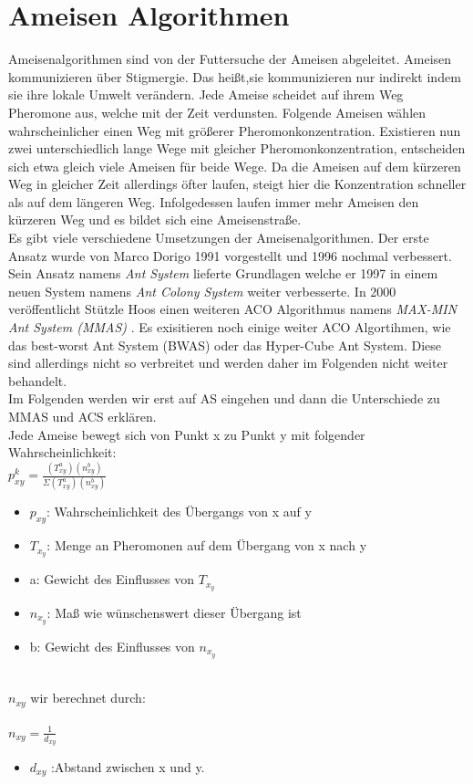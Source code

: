 \section{Ameisen Algorithmen}
Ameisenalgorithmen sind von der Futtersuche der Ameisen abgeleitet. Ameisen kommunizieren über Stigmergie. Das heißt,sie kommunizieren nur indirekt indem sie ihre lokale Umwelt verändern. Jede Ameise scheidet auf ihrem Weg Pheromone aus, welche mit der Zeit verdunsten. 
Folgende Ameisen wählen wahrscheinlicher einen Weg mit größerer Pheromonkonzentration. 
Existieren nun zwei unterschiedlich lange Wege mit gleicher Pheromonkonzentration, entscheiden sich etwa gleich viele Ameisen für beide Wege. 
Da die Ameisen auf dem kürzeren Weg in gleicher Zeit allerdings öfter laufen, steigt hier die Konzentration schneller als auf dem längeren Weg. 
Infolgedessen laufen immer mehr Ameisen den kürzeren Weg und es bildet sich eine Ameisenstraße.\\

Es gibt viele verschiedene Umsetzungen der Ameisenalgorithmen. Der erste Ansatz wurde von Marco Dorigo 1991 vorgestellt\cite{Dorigo1991AntSA} und 1996 nochmal verbessert\cite{484436}.
Sein Ansatz namens \emph{Ant System} lieferte Grundlagen welche er 1997 in einem neuen System namens \emph{Ant Colony System} weiter verbesserte\cite{585892}. In 2000 veröffentlicht Stützle Hoos einen weiteren ACO Algorithmus namens \emph{MAX-MIN Ant System (MMAS)} \cite{STUTZLE2000889}. Es exisitieren noch einige weiter ACO Algortihmen, wie das best-worst Ant System (BWAS)\cite{cordon2000new} oder das Hyper-Cube Ant System. Diese sind allerdings nicht so verbreitet und werden daher im Folgenden nicht weiter behandelt.\cite{blum2004hyper}   \\
Im Folgenden werden wir erst auf AS eingehen und dann die Unterschiede zu MMAS und ACS erklären.\\
Jede Ameise bewegt sich von Punkt x zu Punkt y mit folgender Wahrscheinlichkeit:\\

\large$p_{xy}^k=\frac{(T_{xy}^a)(n_{xy}^b)}{\Sigma(T_{xy}^a)(n_{xy}^b) }$
\normalsize
\begin{itemize}
  \item $p_{xy}$: Wahrscheinlichkeit des Übergangs von x auf y
  \item $T_x_y$: Menge an Pheromonen auf dem Übergang von x nach y 
  \item a: Gewicht des Einflusses von $T_x_y$
  \item $n_x_y$: Maß wie wünschenswert dieser Übergang ist
  \item b: Gewicht des Einflusses von $n_x_y$
\end{itemize}
\\
$n_{xy}$ wir berechnet durch:\\\\\large
$n_{xy}=\frac{1}{d_{xy}}$\normalsize
\begin{itemize}
  \item $d_{xy}$ :Abstand zwischen x und y.
\end{itemize}


